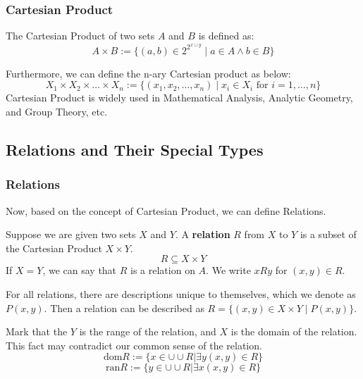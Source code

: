 \documentclass[oneside]{book}
\begin{document}
\subsubsection{Cartesian Product}
\begin{definition}
The Cartesian Product of two sets $A$ and $B$ is defined as:
$$ A \times B := \{ (a,b) \in 2^{2^{x \cup y}} \mid a \in A \wedge b \in B \} $$
\end{definition}
Furthermore, we can define the n-ary Cartesian product as below:
$$ X_1 \times X_2 \times \dots \times X_n := \{ (x_1, x_2, \dots, x_n) \mid x_i \in X_i \text{ for } i=1, \dots, n \} $$
Cartesian Product is widely used in Mathematical Analysis, Analytic Geometry, and Group Theory, etc.

\subsection{Relations and Their Special Types}

\subsubsection{Relations}
Now, based on the concept of Cartesian Product, we can define Relations.
\begin{definition}[Relation]
Suppose we are given two sets $X$ and $Y$. A \textbf{relation} $R$ from $X$ to $Y$ is a subset of the Cartesian Product $X \times Y$.
$$ R \subseteq X \times Y $$
If $X=Y$, we can say that $R$ is a relation on $A$. We write $xRy$ for $(x,y) \in R$.
\end{definition}
For all relations, there are descriptions unique to themselves, which we denote as $P(x,y)$. Then a relation can be described as $R = \{ (x,y) \in X \times Y \mid P(x,y) \}$.

\begin{remark}
Mark that the $Y$ is the range of the relation, and $X$ is the domain of the relation. This fact may contradict our common sense of the relation.
\[
\text{dom}R:=\{x \in \cup \cup R| \exists y (x,y) \in R\}
\]
\[
\text{ran}R:=\{y\in \cup \cup R| \exists x(x,y) \in R\}
\]
\end{remark}
\end{document}
